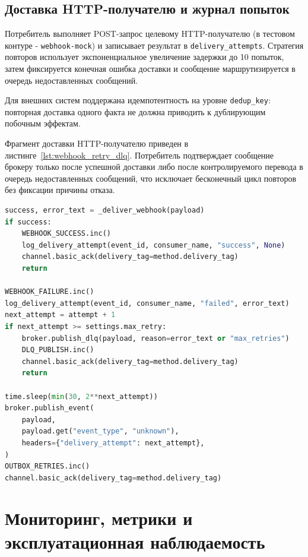 \subsection{Доставка HTTP-получателю и журнал попыток}

Потребитель выполняет POST-запрос целевому HTTP-получателю (в тестовом контуре - \texttt{webhook-mock}) и записывает результат в \texttt{delivery\_attempts}. Стратегия повторов использует экспоненциальное увеличение задержки до 10 попыток, затем фиксируется конечная ошибка доставки и сообщение маршрутизируется в очередь недоставленных сообщений.

Для внешних систем поддержана идемпотентность на уровне \texttt{dedup\_key}: повторная доставка одного факта не должна приводить к дублирующим побочным эффектам.

Фрагмент доставки HTTP-получателю приведен в листинге~\ref{lst:webhook_retry_dlq}. Потребитель подтверждает сообщение брокеру только после успешной доставки либо после контролируемого перевода в очередь недоставленных сообщений, что исключает бесконечный цикл повторов без фиксации причины отказа.

\begin{lstlisting}[language=Python,caption={Доставка HTTP-получателю с повтором и переходом в очередь недоставленных сообщений},label={lst:webhook_retry_dlq}]
success, error_text = _deliver_webhook(payload)
if success:
    WEBHOOK_SUCCESS.inc()
    log_delivery_attempt(event_id, consumer_name, "success", None)
    channel.basic_ack(delivery_tag=method.delivery_tag)
    return

WEBHOOK_FAILURE.inc()
log_delivery_attempt(event_id, consumer_name, "failed", error_text)
next_attempt = attempt + 1
if next_attempt >= settings.max_retry:
    broker.publish_dlq(payload, reason=error_text or "max_retries")
    DLQ_PUBLISH.inc()
    channel.basic_ack(delivery_tag=method.delivery_tag)
    return

time.sleep(min(30, 2**next_attempt))
broker.publish_event(
    payload,
    payload.get("event_type", "unknown"),
    headers={"delivery_attempt": next_attempt},
)
OUTBOX_RETRIES.inc()
channel.basic_ack(delivery_tag=method.delivery_tag)
\end{lstlisting}

\section{Мониторинг, метрики и эксплуатационная наблюдаемость}

